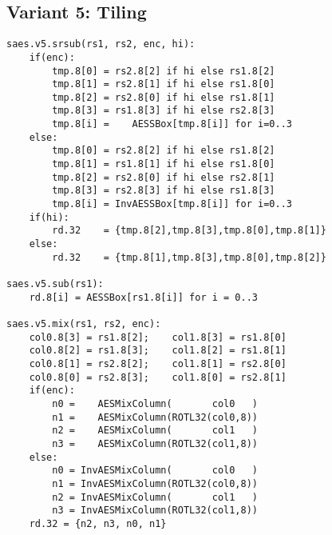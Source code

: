 \subsection{Variant 5: Tiling}

\begin{lstlisting}[language=pseudo,style=block]
saes.v5.srsub(rs1, rs2, enc, hi):
    if(enc):
        tmp.8[0] = rs2.8[2] if hi else rs1.8[2]
        tmp.8[1] = rs2.8[1] if hi else rs1.8[0]
        tmp.8[2] = rs2.8[0] if hi else rs1.8[1]
        tmp.8[3] = rs1.8[3] if hi else rs2.8[3]
        tmp.8[i] =    AESSBox[tmp.8[i]] for i=0..3
    else:
        tmp.8[0] = rs2.8[2] if hi else rs1.8[2]
        tmp.8[1] = rs1.8[1] if hi else rs1.8[0]
        tmp.8[2] = rs2.8[0] if hi else rs2.8[1]
        tmp.8[3] = rs2.8[3] if hi else rs1.8[3]
        tmp.8[i] = InvAESSBox[tmp.8[i]] for i=0..3
    if(hi):
        rd.32    = {tmp.8[2],tmp.8[3],tmp.8[0],tmp.8[1]}
    else:
        rd.32    = {tmp.8[1],tmp.8[3],tmp.8[0],tmp.8[2]}

saes.v5.sub(rs1):
    rd.8[i] = AESSBox[rs1.8[i]] for i = 0..3

saes.v5.mix(rs1, rs2, enc):
    col0.8[3] = rs1.8[2];    col1.8[3] = rs1.8[0]
    col0.8[2] = rs1.8[3];    col1.8[2] = rs1.8[1]
    col0.8[1] = rs2.8[2];    col1.8[1] = rs2.8[0]
    col0.8[0] = rs2.8[3];    col1.8[0] = rs2.8[1]
    if(enc):
        n0 =    AESMixColumn(       col0   )
        n1 =    AESMixColumn(ROTL32(col0,8))
        n2 =    AESMixColumn(       col1   )
        n3 =    AESMixColumn(ROTL32(col1,8))
    else:
        n0 = InvAESMixColumn(       col0   )
        n1 = InvAESMixColumn(ROTL32(col0,8))
        n2 = InvAESMixColumn(       col1   )
        n3 = InvAESMixColumn(ROTL32(col1,8))
    rd.32 = {n2, n3, n0, n1}
\end{lstlisting}


